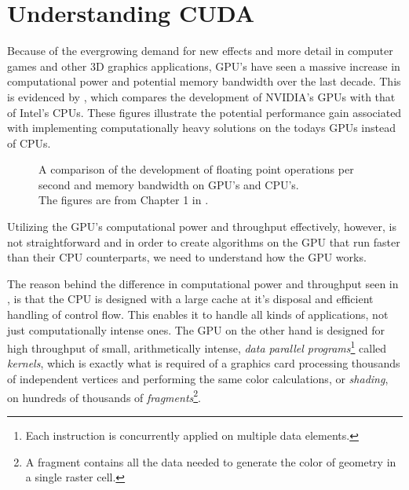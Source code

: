 \chapter{Understanding CUDA}\label{chp:GPGPU}





Because of the evergrowing demand for new effects and more detail in
computer games and other 3D graphics applications, GPU's have seen a
massive increase in computational power and potential memory bandwidth
over the last decade. This is evidenced by ,
which compares the development of NVIDIA's GPUs with that of Intel's
CPUs. These figures illustrate the potential performance gain
associated with implementing computationally heavy solutions on the
todays GPUs instead of CPUs.

\begin{figure}
  \centering 

  
  \caption[Comparison of FLOPS and throughput on GPU's and CPU's.]{A
    comparison of the development of floating point operations per
    second and memory bandwidth on GPU's and CPU's. \\The figures are
    from Chapter 1 in .}\label{fig:gpuCpuCompare}
\end{figure}


Utilizing the GPU's computational power and throughput effectively,
however, is not straightforward and in order to create algorithms on
the GPU that run faster than their CPU counterparts, we need to
understand how the GPU works.

The reason behind the difference in computational power and throughput
seen in , is that the CPU is designed with a
large cache at it's disposal and efficient handling of control
flow. This enables it to handle all kinds of applications, not just
computationally intense ones. The GPU on the other hand is designed
for high throughput of small, arithmetically intense,
\textit{data parallel programs}\footnote{Each instruction is
  concurrently applied on multiple data elements.} called
\textit{kernels}, which is exactly what is required of a graphics card
processing thousands of independent vertices and performing the same
color calculations, or \textit{shading}, on hundreds of thousands of
\textit{fragments}\footnote{A fragment contains all the data needed to
  generate the color of geometry in a single raster cell.}.

